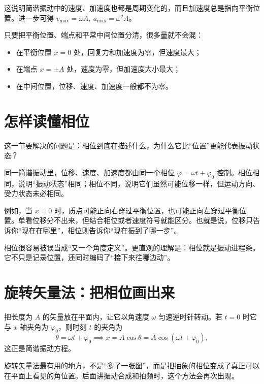\documentclass[lang=cn,11pt]{elegantbook}
\newcommand{\bridge}[1]{\begin{note}#1\end{note}}
\begin{document}
这说明简谐振动中的速度、加速度也都是周期变化的，而且加速度总是指向平衡位置。进一步可得 \(v_{\max}=\omega A,\ a_{\max}=\omega^2A\)。

\begin{note}
只要把平衡位置、端点和平常中间位置分清，很多量就不会混：
\begin{itemize}
  \item 在平衡位置 \(x=0\) 处，回复力和加速度为零，但速度最大；
  \item 在端点 \(x=\pm A\) 处，速度为零，但加速度大小最大；
  \item 在中间位置，位移、速度、加速度一般都不为零。
\end{itemize}
\end{note}

\section{怎样读懂相位}

这一节要解决的问题是：相位到底在描述什么，为什么它比“位置”更能代表振动状态？

同一简谐振动里，位移、速度、加速度都由同一个相位 \(\varphi=\omega t+\varphi_0\) 控制。相位相同，说明“振动状态”相同；相位不同，说明它们虽然可能位移一样，但运动方向、受力状态未必相同。

例如，当 \(x=0\) 时，质点可能正向右穿过平衡位置，也可能正向左穿过平衡位置。单看位移分不出来，但结合相位或者速度符号就能区分。也就是说，位移只告诉你“现在在哪里”，相位则告诉你“现在振到了哪一步”。

\begin{remark}
相位很容易被误当成“又一个角度定义”。更直观的理解是：相位就是振动进程条。它不只是记录位置，还同时编码了“接下来往哪边动”。
\end{remark}

\section{旋转矢量法：把相位画出来}

\begin{definition}[旋转矢量法]
把长度为 \(A\) 的矢量放在平面内，让它以角速度 \(\omega\) 匀速逆时针转动。若 \(t=0\) 时它与 \(x\) 轴夹角为 \(\varphi_0\)，则时刻 \(t\) 的夹角为
\[
\theta=\omega t+\varphi_0
\implies
x=A\cos\theta=A\cos(\omega t+\varphi_0),
\]
这正是简谐振动方程。
\end{definition}

\bridge{旋转矢量法最有用的地方，不是“多了一张图”，而是把抽象的相位变成了真正可以在平面上看见的角位置。后面讲振动合成和拍频时，这个方法会再次出现。}
\end{document}

